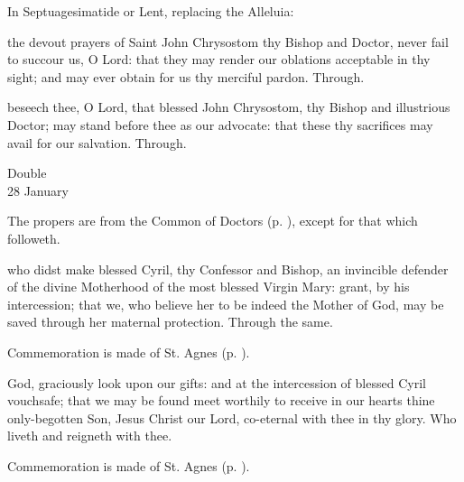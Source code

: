 \begin{rubric}
{In Septuagesimatide or Lent, replacing the Alleluia:}
\end{rubric}\par\noindent
{}

\secret
{} the devout prayers of Saint John Chrysostom thy Bishop and Doctor, never fail to succour us, O Lord: that they may render our oblations acceptable in thy sight; and may ever obtain for us thy merciful pardon. Through.

\postcommunion
{} beseech thee, O Lord, that blessed John Chrysostom, thy Bishop and illustrious Doctor; may stand before thee as our advocate: that these thy sacrifices may avail for our salvation. Through.


\begin{inhead}
    {Double\\
28 January}
\end{inhead}

\begin{rubric}
	The propers are from the Common of Doctors (p. \pageref{CommonDoctors}), except for that which followeth.
\end{rubric}

\collect
{} who didst make blessed Cyril, thy Confessor and Bishop, an invincible defender of the divine Motherhood of the most blessed Virgin Mary: grant, by his intercession; that we, who believe her to be indeed the Mother of God, may be saved through her maternal protection. Through the same.

\begin{rubric}
    Commemoration is made of St. Agnes (p. \pageref{AgnesCollectII}).
\end{rubric}

\secret
{} God, graciously look upon our gifts: and at the intercession of blessed Cyril vouchsafe; that we may be found meet worthily to receive in our hearts thine only-begotten Son, Jesus Christ our Lord, co-eternal with thee in thy glory. Who liveth and reigneth with thee.

\begin{rubric}
    Commemoration is made of St. Agnes (p. \pageref{AgnesSecretII}).
\end{rubric}

